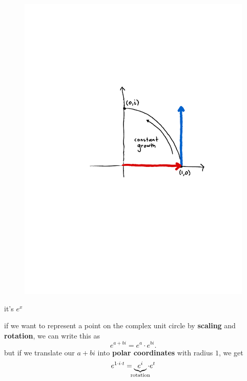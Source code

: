 \documentclass[11pt,serif,aspectratio=169]{beamer}
\begin{document}
	\begin{frame}[c]
		\begin{figure}
			\centering
			\includegraphics[height=0.9\paperheight]{constant-growth.pdf}	
		\end{figure}
	\end{frame}
	
	\begin{frame}[c]\centering
		it's $e^x$
		
		if we want to represent a point on the complex unit circle by \textbf{scaling} and \textbf{rotation}, we can write this as $$e^{a+bi} = e^a \cdot e^{bi}. $$
		but if we translate our $a+bi$ into \textbf{polar coordinates} with radius $1$, we get $$ e^{1 \cdot i \cdot t} = \underbrace{e^i}_{\mathclap{\text{rotation}}} \cdot e^t $$
	\end{frame}
	
\end{document}

